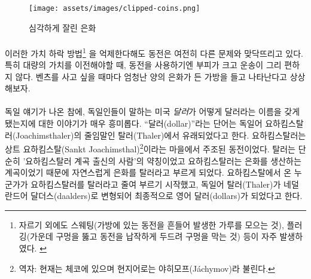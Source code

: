\begin{figure}
	\texttt{[image: assets/images/clipped-coins.png]}
	\caption{심각하게 잘린 은화}
	\label{fig:clipped-coins}
\end{figure}

\paragraph{}
\begin{comment}
	Even with these methods of coin debasement\footnote{Besides clipping, sweating
		(shaking the coins in a bag and collecting the dust worn off) and plugging
		(punching a hole in the middle and hammering the coin flat to close the hole)
		were the most prominent methods of coin debasement. \cite{wiki:coin-debasement}}
	kept in check, coins still suffer from other issues. They are bulky and not very
	convenient to transport, especially when large transfers of value need to
	happen. Showing up with a huge bag of silver dollars every time you want to buy
	a Mercedes isn't very practical.
\end{comment}
이러한 가치 하락 방법\footnote{자르기 외에도 스웨팅(가방에 있는 동전을 흔들어 발생한 가루를 모으는 것),
	플러깅(가운데 구멍을 뚫고 동전을 납작하게 두드려 구멍을 막는 것) 등이 자주 발생하였다.
	\cite{wiki:coin-debasement}}
을 억제한다해도 동전은 여전히 다른 문제와 맞닥뜨리고 있다. 
특히 대량의 가치를 이전해야할 때, 동전을 사용하기엔 부피가 크고 운송이 그리 편하지 않다.
벤츠를 사고 싶을 때마다 엄청난 양의 은화가 든 가방을 들고 나타난다고 상상해보자.

\paragraph{}
\begin{comment}
	Speaking of German things: How the United States \textit{dollar} got its name is
	another interesting story. The word \enquote{dollar} is derived from the German word
	\textit{Thaler}, short for a \textit{Joachimsthaler}~\cite{wiki:thaler}. A
	Joachimsthaler was a coin minted in the town of \textit{Sankt Joachimsthal}.
	Thaler is simply a shorthand for someone (or something) coming from the valley,
	and because Joachimsthal was \textit{the} valley for silver coin production,
	people simply referred to these silver coins as \textit{Thaler.} Thaler (German)
	morphed into daalders (Dutch), and finally dollars (English).
\end{comment}
독일 얘기가 나온 참에, 독일인들이 말하는 미국 \textit{달러}가 어떻게 달러라는 이름을 갖게 됐는지에 대한 이야기가 매우 흥미롭다.
\enquote{달러(dollar)}라는 단어는 독일어 요하킴스탈러(Joachimsthaler)의 줄임말인 탈러(Thaler)에서 유래되었다고 한다\cite{wiki:thaler}. 
요하킴스탈러는 상트 요하킴스탈(Sankt Joachimsthal)\footnote{역자: 현재는 체코에 있으며 현지어로는 야히모프(Jáchymov)라 불린다.}이라는 마을에서 주조된 동전이었다.
탈러는 단순히 '요하킴스탈러 계곡 출신의 사람'의 약칭이었고 요하킴스탈러는 은화를 생산하는 계곡이었기 때문에 자연스럽게 은화를 탈러라고 부르게 되었다. 
요하킴스탈에서 온 누군가가 요하킴스탈러를 탈러라고 줄여 부르기 시작했고, 
독일어 탈러(Thaler)가 네덜란드어 달더스(daalders)로 변형되어 최종적으로 영어 달러(dollars)가 되었다고 한다.


